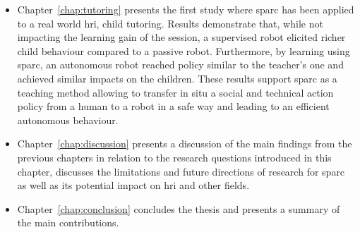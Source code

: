 \begin{itemize}
	\item Chapter~\ref{chap:tutoring} presents the first study where \gls{sparc} has been applied to a real world \gls{hri}, child tutoring. Results demonstrate that, while not impacting the learning gain of the session, a supervised robot elicited richer child behaviour compared to a passive robot. Furthermore, by learning using \gls{sparc}, an autonomous robot reached policy similar to the teacher's one and achieved similar impacts on the children. These results support \gls{sparc} as a teaching method allowing to transfer in situ a social and technical action policy from a human to a robot in a safe way and leading to an efficient autonomous behaviour.
	
	\item Chapter~\ref{chap:discussion} presents a discussion of the main findings from the previous chapters in relation to the research questions introduced in this chapter, discusses the limitations and future directions of research for \gls{sparc} as well as its potential impact on \gls{hri} and other fields.

	\item Chapter~\ref{chap:conclusion} concludes the thesis and presents a summary of the main contributions.
	
\end{itemize}

